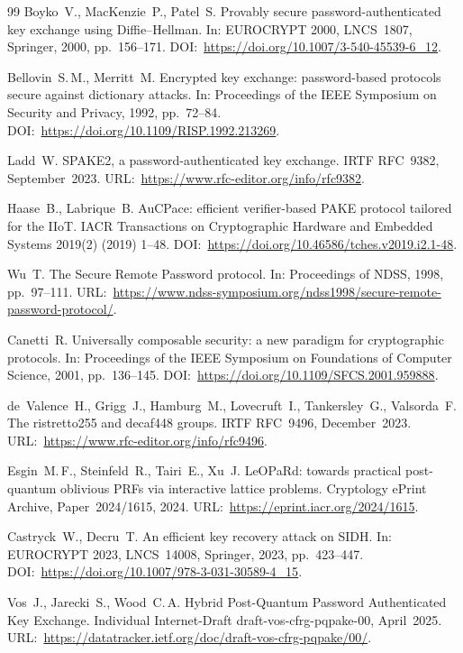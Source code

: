 \documentclass[preprint,12pt]{elsarticle}
\theoremstyle{remark}
\begin{document}
\begin{thebibliography}{99}
Boyko~V., MacKenzie~P., Patel~S.
Provably secure password-authenticated key exchange using Diffie--Hellman.
In: EUROCRYPT 2000, LNCS~1807, Springer, 2000, pp.~156--171.
DOI:~\url{https://doi.org/10.1007/3-540-45539-6_12}.

Bellovin~S.\,M., Merritt~M.
Encrypted key exchange: password-based protocols secure against dictionary attacks.
In: Proceedings of the IEEE Symposium on Security and Privacy, 1992, pp.~72--84.
DOI:~\url{https://doi.org/10.1109/RISP.1992.213269}.

Ladd~W.
SPAKE2, a password-authenticated key exchange.
IRTF RFC~9382, September~2023.
URL:~\url{https://www.rfc-editor.org/info/rfc9382}.

Haase~B., Labrique~B.
AuCPace: efficient verifier-based PAKE protocol tailored for the IIoT.
IACR Transactions on Cryptographic Hardware and Embedded Systems 2019(2) (2019) 1--48.
DOI:~\url{https://doi.org/10.46586/tches.v2019.i2.1-48}.

Wu~T.
The Secure Remote Password protocol.
In: Proceedings of NDSS, 1998, pp.~97--111.
URL:~\url{https://www.ndss-symposium.org/ndss1998/secure-remote-password-protocol/}.

Canetti~R.
Universally composable security: a new paradigm for cryptographic protocols.
In: Proceedings of the IEEE Symposium on Foundations of Computer Science, 2001, pp.~136--145.
DOI:~\url{https://doi.org/10.1109/SFCS.2001.959888}.

de~Valence~H., Grigg~J., Hamburg~M., Lovecruft~I., Tankersley~G.,
Valsorda~F.
The ristretto255 and decaf448 groups.
IRTF RFC~9496, December~2023.
URL:~\url{https://www.rfc-editor.org/info/rfc9496}.

Esgin~M.\,F., Steinfeld~R., Tairi~E., Xu~J.
LeOPaRd: towards practical post-quantum oblivious PRFs via interactive lattice problems.
Cryptology ePrint Archive, Paper~2024/1615, 2024.
URL:~\url{https://eprint.iacr.org/2024/1615}.

Castryck~W., Decru~T.
An efficient key recovery attack on SIDH.
In: EUROCRYPT 2023, LNCS~14008, Springer, 2023, pp.~423--447.
DOI:~\url{https://doi.org/10.1007/978-3-031-30589-4_15}.

Vos~J., Jarecki~S., Wood~C.\,A.
Hybrid Post-Quantum Password Authenticated Key Exchange.
Individual Internet-Draft draft-vos-cfrg-pqpake-00, April~2025.
URL:~\url{https://datatracker.ietf.org/doc/draft-vos-cfrg-pqpake/00/}.


\end{thebibliography}
\end{document}
